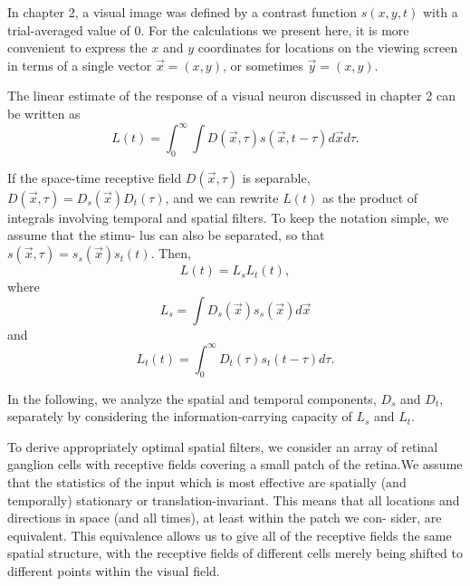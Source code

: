 \begin{ntn}
   In chapter 2, a visual image was defined by a contrast function $s(x,y,t)$
with a trial-averaged value of 0. For the calculations we present here, it
is more convenient to express the $x$ and $y$ coordinates for locations on the viewing screen in terms of a single vector $\vec{x}=(x,y)$, or sometimes $\vec{y}=(x,y)$.
\end{ntn}
\begin{thm}
The linear estimate of the response of a visual neuron discussed in chapter 2 can be written as
\begin{equation}
  \label{equ:4.32}
  L(t)=\int_0^{\infty}\int{D(\vec{x},\tau)s(\vec{x},t-\tau)d\vec{x}d\tau}.
\end{equation}
\end{thm}
\begin{prop}
  If the space-time receptive field $D(\vec{x},\tau)$ is separable, $D(\vec{x},\tau)=D_{s}(\vec{x})D_t(\tau)$,
and we can rewrite $L(t)$ as the product of integrals involving temporal
and spatial filters. To keep the notation simple, we assume that the stimu-
lus can also be separated, so that
$s(\vec{x},\tau)=s_s(\vec{x})s_t(t)$. Then,
\begin{equation}
  \label{equ:separable space-time receptive field }
 L(t)=L_sL_t(t), 
\end{equation}
where
\begin{equation}
  \label{equ:4.33}
  L_s=\int{D_s(\vec{x})s_s(\vec{x})d\vec{x}}
\end{equation}
and
\begin{equation}
  \label{equ:4.34}
  L_t(t)=\int_0^{\infty}D_t(\tau)s_t(t-\tau)d\tau.
\end{equation}
\end{prop}

\begin{rem}
  In the following, we analyze the spatial and temporal components, $D_s$ and
$D_t$, separately by considering the information-carrying capacity of $L_s$ and
$L_t$.
\end{rem}

\begin{asm}
  \label{asm:homogeneity}
  To derive appropriately optimal spatial filters, we consider an array of
retinal ganglion cells with receptive fields covering a small patch of the
retina.We assume that the statistics of the input which is most
effective are spatially (and temporally) stationary or
translation-invariant. This means that all locations
and directions in space (and all times), at least within the patch we con-
sider, are equivalent. This equivalence allows us to give all of the receptive
fields the same spatial structure, with the receptive fields of different cells
merely being shifted to different points within the visual field.
\end{asm}

